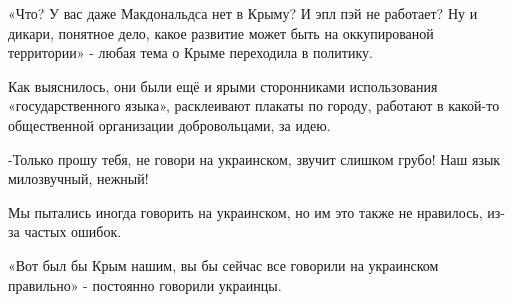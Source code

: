 «Что? У вас даже Макдональдса нет в Крыму? И эпл пэй не работает? Ну и дикари,
понятное дело, какое развитие может быть на оккупированой территории» - любая
тема о Крыме переходила в политику.

Как выяснилось, они были ещё и ярыми сторонниками использования
«государственного языка», расклеивают плакаты по городу, работают в какой-то
общественной организации добровольцами, за идею.

-Только прошу тебя, не говори на украинском, звучит слишком грубо! Наш язык
милозвучный, нежный!

Мы пытались иногда говорить на украинском, но им это также не нравилось, из-за
частых ошибок.

«Вот был бы Крым нашим, вы бы сейчас все говорили на украинском правильно» -
постоянно говорили украинцы.

